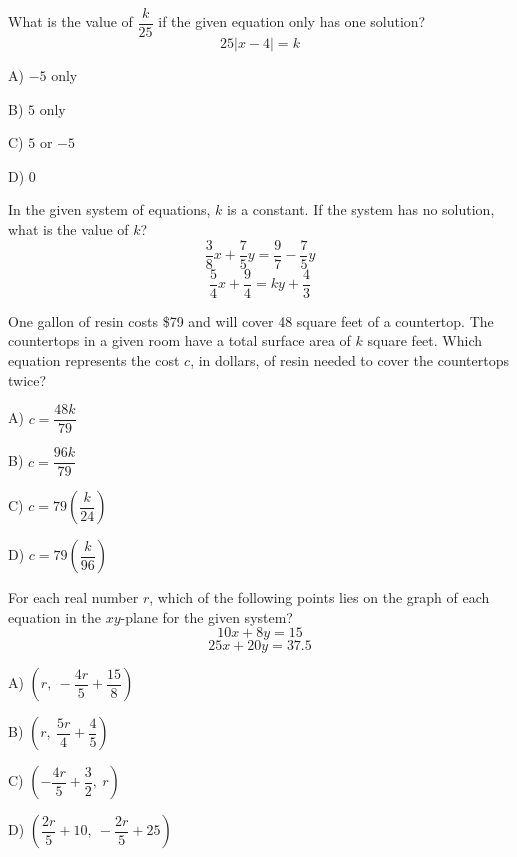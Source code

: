 \vfill
\clearpage
\noindent\begin{minipage}{\linewidth}
\par\smallskip
What is the value of $\dfrac{k}{25}$ if the given equation only has one solution? $$25|x-4|=k$$
\begin{satchoices}
  \item[A)] $-5$ only
  \item[B)] $5$ only
  \item[C)] $5$ or $-5$
  \item[D)] $0$
\end{satchoices}
\end{minipage}
\vfill
\noindent\begin{minipage}{\linewidth}
\par\smallskip
In the given system of equations, $k$ is a constant. If the system has no solution, what is the value of $k$? $$\frac{3}{8}x+\frac{7}{5}y=\frac{9}{7}-\frac{7}{5}y$$ $$\frac{5}{4}x+\frac{9}{4}=ky+\frac{4}{3}$$
\end{minipage}
\vfill
\noindent\begin{minipage}{\linewidth}
\par\smallskip
One gallon of resin costs \$79 and will cover 48 square feet of a countertop. The countertops in a given room have a total surface area of $k$ square feet. Which equation represents the cost $c$, in dollars, of resin needed to cover the countertops twice?
\begin{satchoices}
  \item[A)] $c=\dfrac{48k}{79}$
  \item[B)] $c=\dfrac{96k}{79}$
  \item[C)] $c=79\left(\dfrac{k}{24}\right)$
  \item[D)] $c=79\left(\dfrac{k}{96}\right)$
\end{satchoices}
\end{minipage}
\vfill
\clearpage
\noindent\begin{minipage}{\linewidth}
\par\smallskip
For each real number $r$, which of the following points lies on the graph of each equation in the $xy$-plane for the given system? $$10x+8y=15$$ $$25x+20y=37.5$$
\begin{satchoices}
  \item[A)] $\left(r,\ -\dfrac{4r}{5}+\dfrac{15}{8}\right)$
  \item[B)] $\left(r,\ \dfrac{5r}{4}+\dfrac{4}{5}\right)$
  \item[C)] $\left(-\dfrac{4r}{5}+\dfrac{3}{2},\ r\right)$
  \item[D)] $\left(\dfrac{2r}{5}+10,\ -\dfrac{2r}{5}+25\right)$
\end{satchoices}
\end{minipage}
